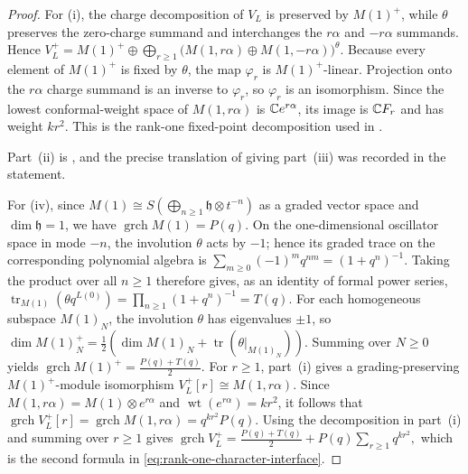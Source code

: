\documentclass[10pt,a4paper]{amsart}
\numberwithin{equation}{section} \newtheorem{thm}{Theorem}[section] \newtheorem{lem}[thm]{Lemma} \newtheorem{ex}[thm]{Example} \newtheorem{prop}[thm]{Proposition} \newtheorem{cor}[thm]{Corollary} \newtheorem{defi}[thm]{Definition} \newtheorem{rmk}[thm]{Remark} \newtheorem{notation}[thm]{Notation}
\newcommand{\wt}{\operatorname{wt}}
\newcommand{\grch}{\operatorname{grch}}
\begin{document}
\begin{proof}
For \textnormal{(i)}, the charge decomposition of $V_L$ is preserved by $M(1)^+$, while $\theta$ preserves the zero-charge summand and interchanges the $r\alpha$ and $-r\alpha$ summands. Hence \(V_L^+=M(1)^+\oplus\bigoplus_{r\ge1}\bigl(M(1,r\alpha)\oplus M(1,-r\alpha)\bigr)^\theta\). Because every element of $M(1)^+$ is fixed by $\theta$, the map $\varphi_r$ is $M(1)^+$-linear. Projection onto the $r\alpha$ charge summand is an inverse to $\varphi_r$, so $\varphi_r$ is an isomorphism. Since the lowest conformal-weight space of $M(1,r\alpha)$ is $\mathbb{C} e^{r\alpha}$, its image is $\mathbb{C} F_r$ and has weight $kr^2$. This is the rank-one fixed-point decomposition used in \cite[Section~2]{DG98}.

Part~\textnormal{(ii)} is \cite[Theorem~2.7(1)]{DG98}, and the precise translation of \cite[Theorems~2.7(2) and~2.9]{DG98} giving part~\textnormal{(iii)} was recorded in the statement.

For \textnormal{(iv)}, since $ M(1)\cong S\!\left(\bigoplus_{n\ge1}\mathfrak h\otimes t^{-n}\right) $ as a graded vector space and $\dim\mathfrak h=1$, we have $\grch M(1)=P(q)$. On the one-dimensional oscillator space in mode $-n$, the involution $\theta$ acts by $-1$; hence its graded trace on the corresponding polynomial algebra is $ \sum_{m\ge0}(-1)^m q^{nm}=(1+q^n)^{-1}. $ Taking the product over all $n\ge1$ therefore gives, as an identity of formal power series, $ \operatorname{tr}_{M(1)}\!\left(\theta q^{L(0)}\right) =\prod_{n\ge1}(1+q^n)^{-1}=T(q). $ For each homogeneous subspace $M(1)_N$, the involution $\theta$ has eigenvalues $\pm1$, so $ \dim M(1)_N^+ =\frac12\left(\dim M(1)_N+ \operatorname{tr}\!\left(\theta|_{M(1)_N}\right)\right). $ Summing over $N\ge0$ yields $ \grch M(1)^+=\frac{P(q)+T(q)}2. $ For $r\ge1$, part~\textnormal{(i)} gives a grading-preserving $M(1)^+$-module isomorphism $V_L^+[r]\cong M(1,r\alpha)$. Since $M(1,r\alpha)=M(1)\otimes e^{r\alpha}$ and $\wt(e^{r\alpha})=kr^2$, it follows that $ \grch V_L^+[r] =\grch M(1,r\alpha) =q^{kr^2}P(q). $ Using the decomposition in part~\textnormal{(i)} and summing over $r\ge1$ gives $ \grch V_L^+ =\frac{P(q)+T(q)}2+ P(q)\sum_{r\ge1}q^{kr^2}, $ which is the second formula in \eqref{eq:rank-one-character-interface}.


\end{proof}
\end{document}

